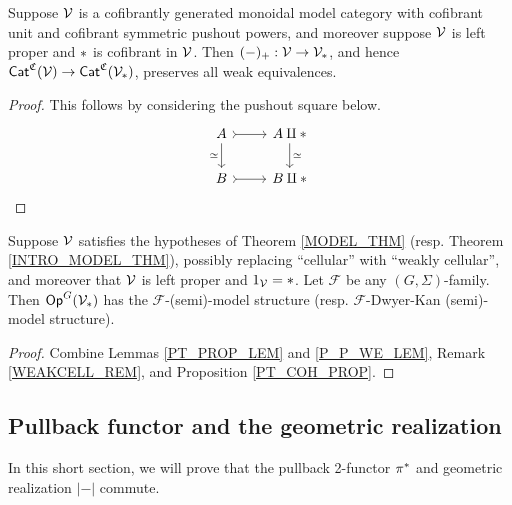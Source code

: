 \documentclass[a4paper,10pt
,draft
]{article}%
\renewcommand{\F}{\mathcal F}
\renewcommand{\1}{\eta}%
\begin{document}
\begin{lemma}
      \label{P_P_WE_LEM}
      Suppose $\mathcal V$ is a cofibrantly generated monoidal model category with cofibrant unit and cofibrant symmetric pushout powers,
      and moreover suppose $\mathcal V$ is left proper and $\**$ is cofibrant in $\mathcal V$.
      Then $(-)_+: \V \to \V_{\**}$, and hence $\Cat^{\mathfrak C}(\V) \to \Cat^{\mathfrak C}(\V_{\**})$, preserves all weak equivalences.
\end{lemma}
\begin{proof}
      This follows by considering the pushout square below.
      \begin{equation}
            \begin{tikzcd}
                  A \arrow[r, rightarrowtail] \arrow[d, "\simeq"']
                  &
                  A \amalg \** \arrow[d, "\simeq"]
                  \\
                  B \arrow[r, rightarrowtail]
                  &
                  B \amalg \**
            \end{tikzcd}
      \end{equation}
\end{proof}

\begin{corollary}
      \label{PT_MODEL_COR}
      Suppose $\mathcal V$ satisfies the hypotheses of Theorem \ref{MODEL_THM} (resp. Theorem \ref{INTRO_MODEL_THM}),
      possibly replacing ``cellular'' with ``weakly cellular'',
      and moreover that $\mathcal V$ is left proper and $1_\V = \**$.
      Let $\F$ be any $(G, \Sigma)$-family.
      Then $\Op^G(\V_{\**})$ has the $\F$-(semi)-model structure (resp. $\F$-Dwyer-Kan (semi)-model structure).
\end{corollary}
\begin{proof}
      Combine Lemmas \ref{PT_PROP_LEM} and \ref{P_P_WE_LEM}, Remark \ref{WEAKCELL_REM}, and Proposition \ref{PT_COH_PROP}.
\end{proof}





\subsection{Pullback functor and the geometric realization}

In this short section, we will prove that the pullback 2-functor $\pi^{\**}$ and geometric realization $|-|$ commute.
\end{document}
